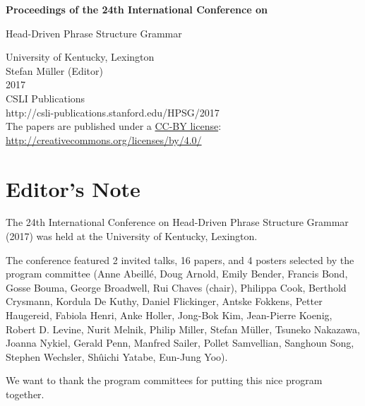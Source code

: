 \documentclass[11pt,a4paper,fleqn]{article}
\begin{document}
\begin{center}
{\Large
                {\bfseries Proceedings of the 24th International Conference on\par Head-Driven Phrase Structure Grammar\par}

                \vspace{8ex}

                     University of Kentucky, Lexington\\[\baselineskip]

                        Stefan M{\"u}ller (Editor)\\[\baselineskip]

                                2017\\[\baselineskip]

                          CSLI Publications\\[\baselineskip]

              http://csli-publications.stanford.edu/HPSG/2017 \\[4\baselineskip]

The papers are published under a \href{http://creativecommons.org/licenses/by/4.0/}{CC-BY license}:\\[3pt]
\href{http://creativecommons.org/licenses/by/4.0/}{http://creativecommons.org/licenses/by/4.0/}
}
\end{center}
\newpage
\tableofcontents

\newpage

\section{Editor's Note}
The 24th International Conference on Head-Driven Phrase Structure Grammar (2017) was held at
the University of Kentucky, Lexington.

The conference featured 2 invited talks, 16 papers, and 4 posters selected by the program committee 
(Anne Abeillé,
Doug Arnold,
Emily Bender,
Francis Bond,
Gosse Bouma,
George Broadwell,
Rui Chaves (chair),
Philippa Cook,
Berthold Crysmann,
Kordula De Kuthy,
Daniel Flickinger,
Antske Fokkens,
Petter Haugereid,
Fabiola Henri,
Anke Holler,
Jong-Bok Kim,
Jean-Pierre Koenig,
Robert D. Levine,
Nurit Melnik,
Philip Miller,
Stefan Müller,
Tsuneko Nakazawa,
Joanna Nykiel,
Gerald Penn,
Manfred Sailer,
Pollet Samvellian,
Sanghoun Song,
Stephen Wechsler,
Shûichi Yatabe,
Eun-Jung Yoo).


We want to thank the program committees for putting this nice program together.
\end{document}
